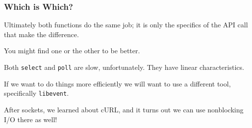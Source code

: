 \begin{frame}
	\frametitle{Which is Which?}

	Ultimately both functions do the same job; it is only the specifics of the API call that make the difference.

	You might find one or the other to be better.

	Both \texttt{select} and \texttt{poll} are slow, unfortunately. They have linear characteristics.

	If we want to do things more efficiently we will want to use a different tool, specifically \texttt{libevent}.

	After sockets, we learned about cURL, and it turns out we can use nonblocking I/O there as well!

\end{frame}





